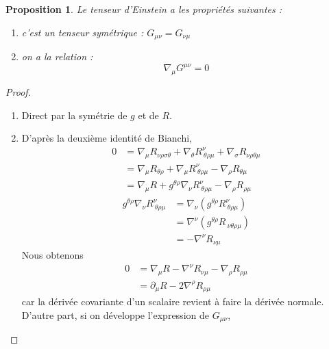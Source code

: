 \documentclass[a4paper,11pt]{report}
\theoremstyle{definition}
\theoremstyle{plain}
\newtheorem{prop}[thm]{Proposition}
\theoremstyle{definition}
\theoremstyle{remark}
\newcommand{\p}{\partial}
\begin{document}
        \begin{prop}
            Le tenseur d'Einstein a les propriétés suivantes :
            \begin{enumerate}[label = \textit{\roman*)}]
                \item c'est un tenseur symétrique : $G_{\mu\nu} = G_{\nu\mu}$
                \item on a la relation :
                \begin{equation}
                    \nabla_\mu G^{\mu\nu} = 0
                \end{equation}
            \end{enumerate}
        \end{prop}
        
        \begin{proof}${}$
            \begin{enumerate}[label = \textit{\roman*)}]
                \item Direct par la symétrie de $g$ et de $R$.
                \item D'après la deuxième identité de Bianchi, 
                \begin{align}
                    0& =\nabla_\mu R_{\nu\rho\sigma\theta} + \nabla_\theta R^\nu_{~\theta\rho\mu}+\nabla_\sigma R_{\nu\rho\theta\mu} \\
                    &= \nabla_\mu R_{\theta\rho}+\nabla_\mu R^\nu_{~\theta\rho\mu} - \nabla_\rho R_{\theta\mu} \\
                    &= \nabla_\mu R + g^{\theta\rho} \nabla_\nu R^\nu_{~\theta\rho\mu} - \nabla_\rho R_{\rho\mu} 
                \end{align}
                \begin{align}
                    g^{\theta\rho} \nabla_\nu R^\nu_{~\theta\rho\mu} &= \nabla_\nu (g^{\theta\rho}R^\nu_{~\theta\rho\mu}) \\
                    &= \nabla^\nu (g^{\theta\rho}R_{~\nu\theta\rho\mu})\\
                    &= -\nabla^\nu R_{\nu\mu}
                \end{align}
                Nous obtenons 
                \begin{align}
                    0 &= \nabla_\mu R -\nabla^\nu R_{\nu\mu} - \nabla_\rho R_{\rho\mu}\\
                    &= \p_\mu R -2\nabla^\rho R_{\rho\mu}
                \end{align}
                car la dérivée covariante d'un scalaire revient à faire la dérivée normale. D'autre part, si on développe l'expression de $G_{\mu\nu}$,

\end{enumerate}
\end{proof}
\end{document}
